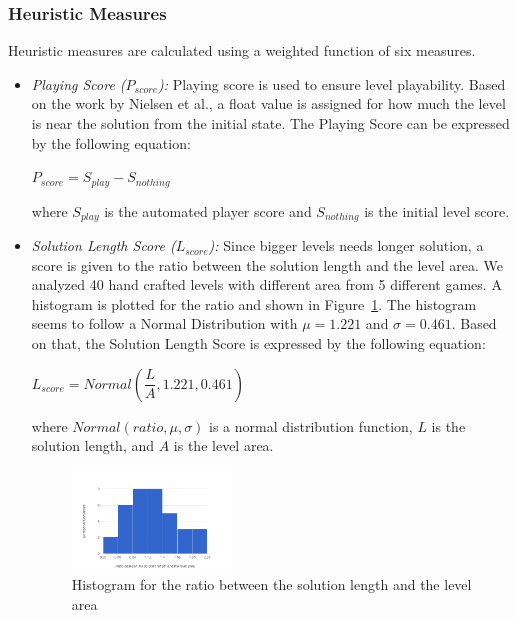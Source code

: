 \documentclass[letterpaper]{article}
\newcommand{\figref}[1]{Figure~\ref{Figure:#1}}
\begin{document}
\subsubsection{Heuristic Measures}
Heuristic measures are calculated using a weighted function of six measures.
\begin{itemize}
	\item \emph{Playing Score ($P_{score}$):} Playing score is used to ensure level playability. Based on the work by Nielsen et al.\cite{gvgpPerformanceProfiles}, a float value is assigned for how much the level is near the solution from the initial state. The Playing Score can be expressed by the following equation:
	\begin{center}$ P_{score} = S_{play} - S_{nothing}$\end{center}
	where $S_{play}$ is the automated player score and $S_{nothing}$ is the initial level score.
	
	\item\emph{Solution Length Score ($L_{score}$):} Since bigger levels needs longer solution, a score is given to the ratio between the solution length and the level area. We analyzed 40 hand crafted levels with different area from 5 different games. A histogram is plotted for the ratio and shown in \figref{solutionLengthHistogram}. The histogram seems to follow a Normal Distribution with $\mu = 1.221$ and $\sigma = 0.461$. Based on that, the Solution Length Score is expressed by the following equation:
	\begin{center}$L_{score} = Normal(\dfrac{L}{A}, 1.221, 0.461)$\end{center}
	where $Normal(ratio, \mu, \sigma)$ is a normal distribution function, $L$ is the solution length, and $A$ is the level area.
	\begin{figure}[ht]
		\centering
		\includegraphics[width=0.4\textwidth]{Images/solutionLengthHistogram}
		\caption{Histogram for the ratio between the solution length and the level area}
		\label{Figure:solutionLengthHistogram}
	\end{figure}
	

\end{itemize}
\end{document}
